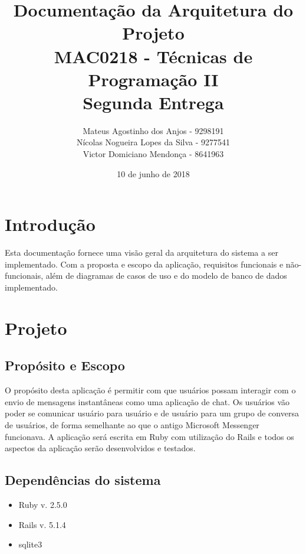 \documentclass[11pt,a4paper,titlepage]{article}
\title{Documentação da Arquitetura do Projeto \\
MAC0218 - Técnicas de Programação II\\
Segunda Entrega}
\author{Mateus Agostinho dos Anjos - 9298191\\Nícolas Nogueira Lopes da Silva - 9277541\\Victor Domiciano Mendonça - 8641963}
\date{10 de junho de 2018}
\begin{document}
\maketitle

\tableofcontents

\pagebreak

\section{Introdução}
Esta documentação fornece uma visão geral da arquitetura do sistema a ser implementado. Com a proposta e escopo da aplicação, requisitos funcionais e não-funcionais, além de diagramas de casos de uso e do modelo de banco de dados implementado.

\section{Projeto}
\subsection{Propósito e Escopo}
O propósito desta aplicação é permitir com que usuários possam interagir com o envio de mensagens instantâneas como uma aplicação de chat. Os usuários vão poder se comunicar usuário para usuário e de usuário para um grupo de conversa de usuários, de forma semelhante ao que o antigo Microsoft Messenger funcionava. A aplicação será escrita em Ruby com utilização do Rails e todos os aspectos da aplicação serão desenvolvidos e testados.
\subsection{Dependências do sistema}
\begin{itemize}
\item Ruby v. 2.5.0
\item Rails v. 5.1.4
\item sqlite3
\end{itemize}
\end{document}

